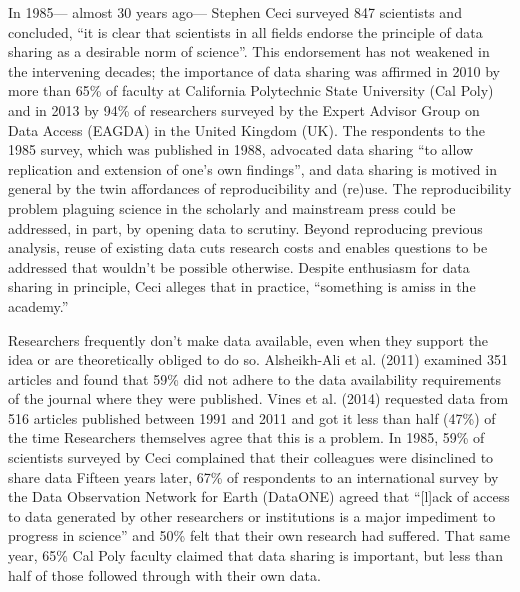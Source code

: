 \documentclass[10pt]{article}
\begin{document}
In 1985--- almost 30 years ago--- Stephen Ceci surveyed 847 scientists and concluded, ``it is clear that scientists in all fields endorse the principle of data sharing as a desirable norm of science''\cite{ceci_scientists_1988}.
This endorsement has not weakened in the intervening decades; the importance of data sharing was affirmed in 2010 by more than 65\% of faculty at California Polytechnic State University (Cal Poly)\cite{scaramozzino_study_2012} and in 2013 by 94\% of researchers surveyed by the Expert Advisor Group on Data Access (EAGDA) in the United Kingdom (UK)\cite{bobrow_establishing_2014}.
The respondents to the 1985 survey, which was published in 1988, advocated data sharing ``to allow replication and extension of one's own findings''\cite{ceci_scientists_2014}, and data sharing is motived in general by the twin affordances of reproducibility and (re)use.
The reproducibility problem plaguing science in the scholarly\cite{ioannidis_why_2005, prinz_believe_2011, mobley_survey_2013} and mainstream\cite{zimmer_rise_2013, _how_2013, _trouble_2013} press could be addressed, in part, by opening data to scrutiny\cite{drew_lost_2013, collins_policy_2014}.
Beyond reproducing previous analysis, reuse of existing data cuts research costs\cite{piwowar_data_2011} and enables questions to be addressed that wouldn't be possible otherwise\cite{stewart_meta-analysis_2009, borenstein_introduction_2011}.
Despite enthusiasm for data sharing in principle, Ceci alleges that in practice, ``something is amiss in the academy.''

Researchers frequently don't make data available, even when they support the idea or are theoretically obliged to do so.
Alsheikh-Ali et al. (2011) examined 351 articles and found that 59\% did not adhere to the data availability requirements of the journal where they were published.
Vines et al. (2014) requested data from 516 articles published between 1991 and 2011 and got it less than half (47\%) of the time\cite{vines_availability_2014}
Researchers themselves agree that this is a problem.
In 1985, 59\% of scientists surveyed by Ceci complained that their colleagues were disinclined to share data\cite{ceci_scientists_1988}
Fifteen years later, 67\% of respondents to an international survey by the Data Observation Network for Earth (DataONE) agreed that ``[l]ack of access to data generated by other researchers or institutions is a major impediment to progress in science'' and 50\% felt that their own research had suffered\cite{tenopir_data_2011}.
That same year, 65\% Cal Poly faculty claimed that data sharing is important, but less than half of those followed through with their own data\cite{scaramozzino_study_2012}.
\end{document}

